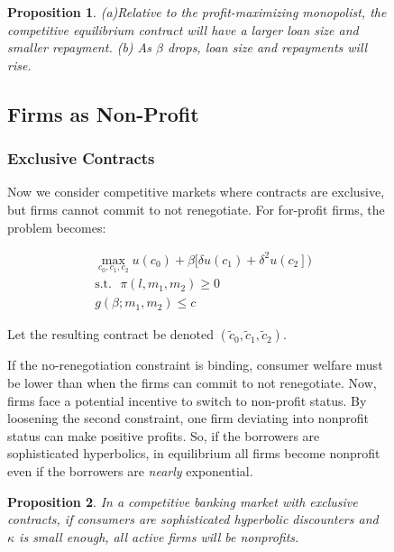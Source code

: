 \documentclass[11pt]{article}%
\newtheorem{proposition}{Proposition}
\begin{document}
\begin{figure}
{\begin{proposition}
(a)Relative to the profit-maximizing monopolist, the competitive equilibrium
contract will have a larger loan size and smaller repayment. (b) As $\beta$
drops, loan size and repayments will rise.
\end{proposition}

\subsection{Firms as Non-Profit}

\subsubsection{Exclusive Contracts}

Now we consider competitive markets where contracts are exclusive, but firms
cannot commit to not renegotiate. For for-profit firms, the problem becomes:%

\begin{align*}
&  \max_{c_{0},c_{1},c_{2}}u\left(  c_{0}\right)  +\beta[\delta u\left (c_{1}%
\right)  +\delta^{2}u\left(  c_{2}\right]) \\
&  \text{s}\text{.t}\text{.}\text{ }\pi\left(  l,m_{1},m_{2}\right)  \geq0\\
&  g\left(  \beta;m_{1},m_{2}\right)  \leq c
\end{align*}


Let the resulting contract be denoted $\left(  \tilde{c}_{0},\tilde{c}%
_{1},\tilde{c}_{2}\right)  $.

If the no-renegotiation constraint is binding, consumer welfare must be lower
than when the firms can commit to not renegotiate. Now, firms face a potential
incentive to switch to non-profit status. By loosening the second constraint,
one firm deviating into nonprofit status can make positive profits. So, if the
borrowers are sophisticated hyperbolics, in equilibrium all firms become
nonprofit even if the borrowers are \textit{nearly} exponential.

\begin{proposition}
In a competitive banking market with exclusive contracts, if consumers are
sophisticated hyperbolic discounters and $\kappa$ is small enough, all active
firms will be nonprofits.
\end{proposition}

}
\end{figure}
\end{document}
